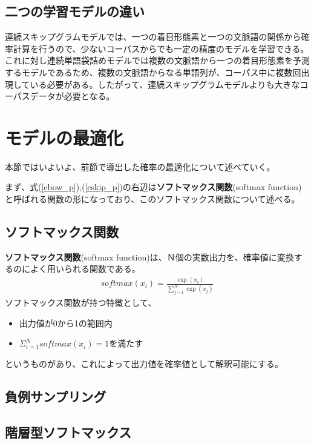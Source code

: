 \subsection{二つの学習モデルの違い}
連続スキップグラムモデルでは、一つの着目形態素と一つの文脈語の関係から確率計算を行うので、少ないコーパスからでも一定の精度のモデルを学習できる。これに対し連続単語袋詰めモデルでは複数の文脈語から一つの着目形態素を予測するモデルであるため、複数の文脈語からなる単語列が、コーパス中に複数回出現している必要がある。したがって、連続スキップグラムモデルよりも大きなコーパスデータが必要となる。\cite{book_wm}

\section{モデルの最適化}
本節ではいよいよ、前節で導出した確率の最適化について述べていく。

まず、式(\ref{cbow_p}),(\ref{cskip_p})の右辺は\textbf{ソフトマックス関数}(softmax function)と呼ばれる関数の形になっており、このソフトマックス関数について述べる。

\subsection{ソフトマックス関数}
\textbf{ソフトマックス関数}(softmax function)は、Ｎ個の実数出力を、確率値に変換するのによく用いられる関数である。
\begin{eqnarray}
  \label{softmax_p}
  softmax(x_i) = \frac{\exp(x_i)}{\sum_{j=1}^{N}\exp(x_j)}
\end{eqnarray}
ソフトマックス関数が持つ特徴として、
\begin{itemize}
  \item 出力値が0から1の範囲内
  \item $\Sigma_{i=1}^Nsoftmax(x_i)=1$を満たす
\end{itemize}
というものがあり、これによって出力値を確率値として解釈可能にする。

\subsection{}

\subsection{負例サンプリング}

\subsection{階層型ソフトマックス}
